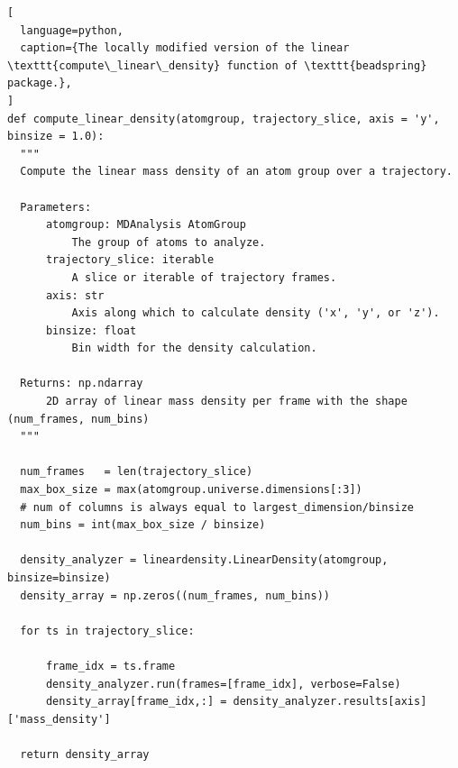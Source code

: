 \documentclass[10pt,a4paper]{labreport}
\begin{document}
\begin{lstlisting}[
  language=python, 
  caption={The locally modified version of the linear \texttt{compute\_linear\_density} function of \texttt{beadspring} package.},
]
def compute_linear_density(atomgroup, trajectory_slice, axis = 'y', binsize = 1.0):
  """
  Compute the linear mass density of an atom group over a trajectory.

  Parameters:
      atomgroup: MDAnalysis AtomGroup
          The group of atoms to analyze.
      trajectory_slice: iterable
          A slice or iterable of trajectory frames.
      axis: str
          Axis along which to calculate density ('x', 'y', or 'z').
      binsize: float
          Bin width for the density calculation.

  Returns: np.ndarray
      2D array of linear mass density per frame with the shape (num_frames, num_bins)
  """

  num_frames   = len(trajectory_slice)
  max_box_size = max(atomgroup.universe.dimensions[:3])
  # num of columns is always equal to largest_dimension/binsize
  num_bins = int(max_box_size / binsize)

  density_analyzer = lineardensity.LinearDensity(atomgroup, binsize=binsize)
  density_array = np.zeros((num_frames, num_bins))

  for ts in trajectory_slice:

      frame_idx = ts.frame
      density_analyzer.run(frames=[frame_idx], verbose=False)
      density_array[frame_idx,:] = density_analyzer.results[axis]['mass_density']

  return density_array
\end{lstlisting}
\end{document}
